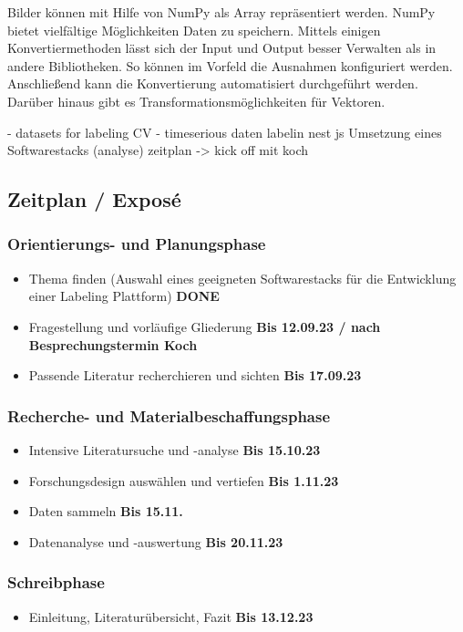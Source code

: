 Bilder können mit Hilfe von NumPy als Array repräsentiert werden. NumPy bietet vielfältige Möglichkeiten Daten zu speichern. Mittels einigen Konvertiermethoden lässt sich der Input und Output besser Verwalten als in andere Bibliotheken. So können im Vorfeld die Ausnahmen konfiguriert werden. Anschließend kann die Konvertierung automatisiert durchgeführt werden.
Darüber hinaus gibt es Transformationsmöglichkeiten für Vektoren.


- datasets for labeling CV
- timeserious daten labelin
nest js
Umsetzung eines Softwarestacks
(analyse)
zeitplan -> kick off mit koch

\subsection*{Zeitplan / Exposé}
\subsubsection*{Orientierungs- und Planungsphase}
\begin{itemize}
    \item Thema finden (Auswahl eines geeigneten Softwarestacks für die Entwicklung einer Labeling Plattform) \textbf{DONE}
    \item Fragestellung und vorläufige Gliederung \textbf{Bis 12.09.23 / nach Besprechungstermin Koch}
    \item Passende Literatur recherchieren und sichten \textbf{Bis 17.09.23}
\end{itemize}

\subsubsection*{Recherche- und Materialbeschaffungsphase}
\begin{itemize}
    \item Intensive Literatursuche und -analyse \textbf{Bis 15.10.23}
    \item Forschungsdesign auswählen und vertiefen \textbf{Bis 1.11.23}
    \item Daten sammeln \textbf{Bis 15.11.}
    \item Datenanalyse und -auswertung \textbf{Bis 20.11.23} 
\end{itemize}


\subsubsection*{Schreibphase}
    \begin{itemize}
        \item Einleitung, Literaturübersicht, Fazit \textbf{Bis 13.12.23}
    \end{itemize}

